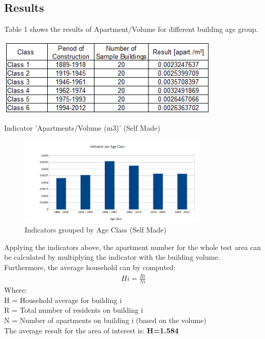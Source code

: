 \documentclass[11pt]{article}
\begin{document}
\subsection{Results}


Table 1 shows the results of Apartment/Volume for different building age group.

\begin{table}[ht]
	\centering
	\includegraphics[width=0.8\textwidth]{fig5.png}
	\caption{Indicator 'Apartments/Volume (m3)' (Self Made)}
	\label{fig:figure5}
\end{table}


\begin{figure}[ht]
	\centering
	\includegraphics[width=0.8\textwidth]{fig6.png}
	\caption{Indicators grouped by Age Class (Self Made)}
	\label{fig:figure6}
\end{figure}

Applying the indicators above, the apartment number for the whole test area can be calculated by multiplying the indicator with the building volume. Furthermore, the average household can by computed:\\
\begin{align}
Hi=\frac{Ri}{Ni}
\end{align}
Where:\\
H = Household average for building i\\
R = Total number of residents on building i\\
N = Number of apartments on building i (based on the volume)\\

The average result for the area of interest is: \textbf{H=1.584}
\\
\end{document}
